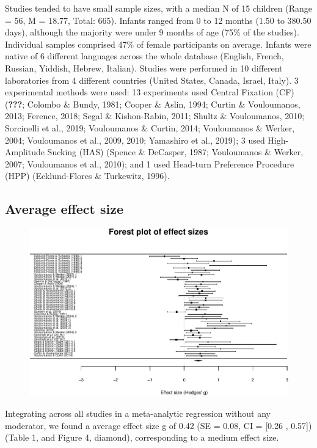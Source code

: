 \documentclass[man]{apa6}
\begin{document}
Studies tended to have small sample sizes, with a median N of 15
children (Range = 56, M = 18.77, Total: 665). Infants ranged from 0 to
12 months (1.50 to 380.50 days), although the majority were under 9
months of age (75\% of the studies). Individual samples comprised 47\%
of female participants on average. Infants were native of 6 different
languages across the whole database (English, French, Russian, Yiddish,
Hebrew, Italian). Studies were performed in 10 different laboratories
from 4 different countries (United States, Canada, Israel, Italy). 3
experimental methods were used: 13 experiments used Central Fixation
(CF) ({\textbf{???}}; Colombo \& Bundy, 1981; Cooper \& Aslin, 1994;
Curtin \& Vouloumanos, 2013; Ference, 2018; Segal \& Kishon-Rabin, 2011;
Shultz \& Vouloumanos, 2010; Sorcinelli et al., 2019; Vouloumanos \&
Curtin, 2014; Vouloumanos \& Werker, 2004; Vouloumanos et al., 2009,
2010; Yamashiro et al., 2019); 3 used High-Amplitude Sucking (HAS)
(Spence \& DeCasper, 1987; Vouloumanos \& Werker, 2007; Vouloumanos et
al., 2010); and 1 used Head-turn Preference Procedure (HPP)
(Ecklund-Flores \& Turkewitz, 1996).

\subsection{Average effect size}\label{average-effect-size}

\begin{figure}
\centering
\includegraphics{MA_speech_pref_files/figure-latex/forest plot-1.pdf}
\caption{}
\end{figure}

Integrating across all studies in a meta-analytic regression without any
moderator, we found a average effect size g of 0.42 (SE = 0.08, CI =
{[}0.26 , 0.57{]}) (Table 1, and Figure 4, diamond), corresponding to a
medium effect size.
\end{document}
